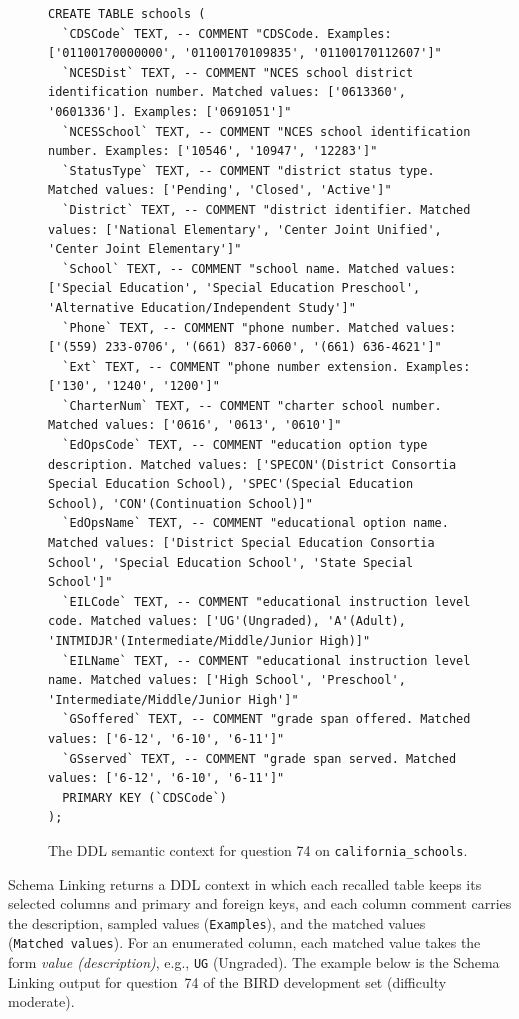 \begin{figure}[!t]
\begin{lstlisting}
CREATE TABLE schools (
  `CDSCode` TEXT, -- COMMENT "CDSCode. Examples: ['01100170000000', '01100170109835', '01100170112607']"
  `NCESDist` TEXT, -- COMMENT "NCES school district identification number. Matched values: ['0613360', '0601336']. Examples: ['0691051']"
  `NCESSchool` TEXT, -- COMMENT "NCES school identification number. Examples: ['10546', '10947', '12283']"
  `StatusType` TEXT, -- COMMENT "district status type. Matched values: ['Pending', 'Closed', 'Active']"
  `District` TEXT, -- COMMENT "district identifier. Matched values: ['National Elementary', 'Center Joint Unified', 'Center Joint Elementary']"
  `School` TEXT, -- COMMENT "school name. Matched values: ['Special Education', 'Special Education Preschool', 'Alternative Education/Independent Study']"
  `Phone` TEXT, -- COMMENT "phone number. Matched values: ['(559) 233-0706', '(661) 837-6060', '(661) 636-4621']"
  `Ext` TEXT, -- COMMENT "phone number extension. Examples: ['130', '1240', '1200']"
  `CharterNum` TEXT, -- COMMENT "charter school number. Matched values: ['0616', '0613', '0610']"
  `EdOpsCode` TEXT, -- COMMENT "education option type description. Matched values: ['SPECON'(District Consortia Special Education School), 'SPEC'(Special Education School), 'CON'(Continuation School)]"
  `EdOpsName` TEXT, -- COMMENT "educational option name. Matched values: ['District Special Education Consortia School', 'Special Education School', 'State Special School']"
  `EILCode` TEXT, -- COMMENT "educational instruction level code. Matched values: ['UG'(Ungraded), 'A'(Adult), 'INTMIDJR'(Intermediate/Middle/Junior High)]"
  `EILName` TEXT, -- COMMENT "educational instruction level name. Matched values: ['High School', 'Preschool', 'Intermediate/Middle/Junior High']"
  `GSoffered` TEXT, -- COMMENT "grade span offered. Matched values: ['6-12', '6-10', '6-11']"
  `GSserved` TEXT, -- COMMENT "grade span served. Matched values: ['6-12', '6-10', '6-11']"
  PRIMARY KEY (`CDSCode`)
);
\end{lstlisting}
\caption{The DDL semantic context for question 74 on \texttt{california\_schools}.}
\label{fig:ddl-context}
\end{figure}

Schema Linking returns a DDL context in which each recalled table keeps its selected
columns and primary and foreign keys, and each column comment carries the description,
sampled values (\texttt{Examples}), and the matched values (\texttt{Matched\ values}). For
an enumerated column, each matched value takes the form \emph{value (description)}, e.g.,
\texttt{\textquotesingle UG\textquotesingle} (Ungraded). The example below is the Schema
Linking output for question~74 of the BIRD development set (difficulty moderate).

